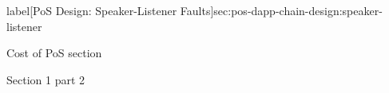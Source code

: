 \documentclass[a4paper]{article}
\begin{document}
label[PoS Design: Speaker-Listener Faults]{sec:pos-dapp-chain-design:speaker-listener}


\begin{section}{Cost of PoS section}

  

\end{section}

\newpage

  \begin{section}{Section 1 part 2}









\end{section}
\end{document}
